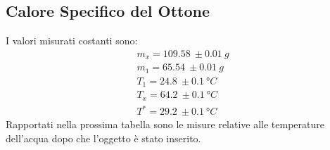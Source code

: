 \documentclass[a4paper]{article}
\begin{document}
\subsection{Calore Specifico del Ottone}
I valori misurati costanti sono:
\begin{align}
     m_x = \SI{109.58}{}\pm{\SI{0.01}{g}} \\
    m_1 = \SI{65.54}{}\pm{\SI{0.01}{g}}\\
    T_1 = \SI{24.8}{} \pm{\SI{0.1}{\degree C}} \\
    T_x = \SI{64.2}{} \pm{\SI{0.1}{\degree C}}\\
    T^* = \SI{29.2}{} \pm{\SI{0.1}{\degree C}}
\end{align}
Rapportati nella prossima tabella sono le misure relative alle temperature dell'acqua dopo che l'oggetto è stato inserito. 
\end{document}
